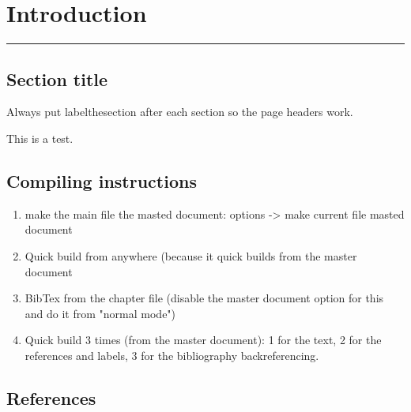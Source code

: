 \chapter{Introduction}
\label{\thechapter}
\label{Introduction}


\rule{\textwidth}{1.6pt}
\minitoc
\clearpage


\section{Section title}
\label{\thesection}

Always put label{thesection} after each section so the page headers work. 

This is a test. 

\section{Compiling instructions}

\begin{enumerate}
\item make the main file the masted document: options -> make current file masted document

\item Quick build from anywhere (because it quick builds from the master document

\item BibTex from the chapter file (disable the master document option for this and do it from "normal mode")

\item Quick build 3 times (from the master document): 1 for the text, 2 for the references and labels, 3 for the bibliography backreferencing.
\end{enumerate}


\section{References}
\label{\thesection}
\vspace{-1.5cm}


